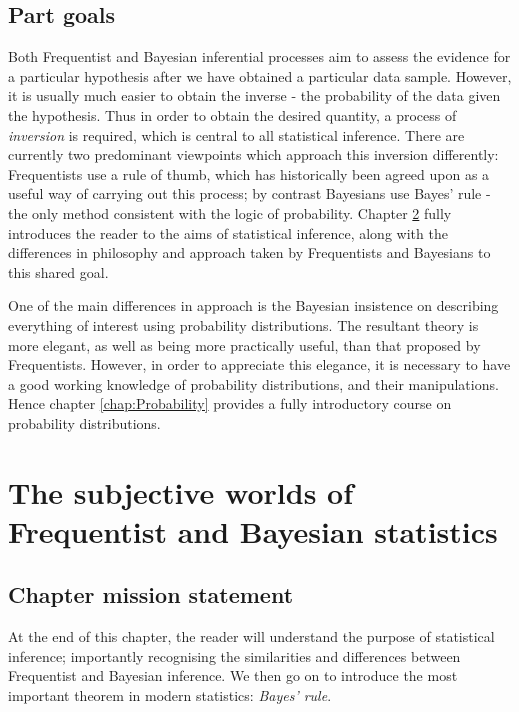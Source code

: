\documentclass[11pt,fullpage]{book}
\begin{document}
\section{Part goals}
Both Frequentist and Bayesian inferential processes aim to assess the evidence for a particular hypothesis after we have obtained a particular data sample. However, it is usually much easier to obtain the inverse - the probability of the data given the hypothesis. Thus in order to obtain the desired quantity, a process of \textit{inversion} is required, which is central to all statistical inference. There are currently two predominant viewpoints which approach this inversion differently: Frequentists use a rule of thumb, which has historically been agreed upon as a useful way of carrying out this process; by contrast Bayesians use Bayes' rule - the only method consistent with the logic of probability. Chapter \ref{chap:subjectiveFrequentistBayes} fully introduces the reader to the aims of statistical inference, along with the differences in philosophy and approach taken by Frequentists and Bayesians to this shared goal. 

One of the main differences in approach is the Bayesian insistence on describing everything of interest using probability distributions. The resultant theory is more elegant, as well as being more practically useful, than that proposed by Frequentists. However, in order to appreciate this elegance, it is necessary to have a good working knowledge of probability distributions, and their manipulations. Hence chapter \ref{chap:Probability} provides a fully introductory course on probability distributions. 

\chapter{The subjective worlds of Frequentist and Bayesian statistics}\label{chap:subjectiveFrequentistBayes}
\section{Chapter mission statement}
At the end of this chapter, the reader will understand the purpose of statistical inference; importantly recognising the similarities and differences between Frequentist and Bayesian inference. We then go on to introduce the most important theorem in modern statistics: \textit{Bayes' rule}.
 
\end{document}
